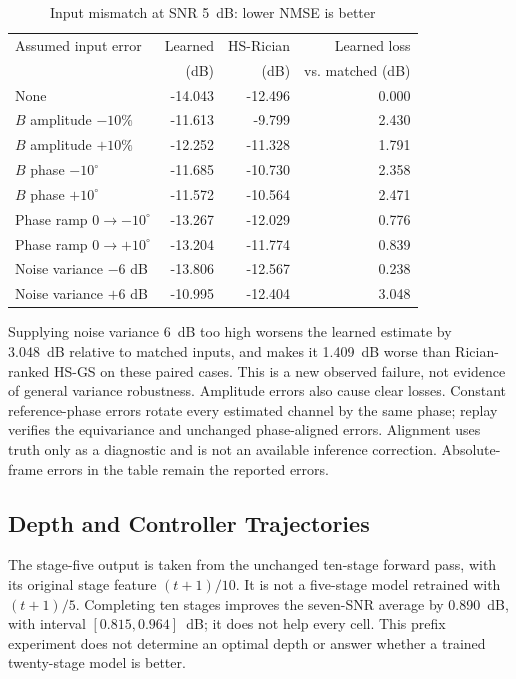 \begin{table}[!t]
\caption{Input mismatch at SNR 5~dB: lower NMSE is better}
\centering\small\setlength{\tabcolsep}{5pt}
\begin{tabular}{@{}lrrr@{}}\toprule
Assumed input error & Learned & HS-Rician & Learned loss\\
 & (dB) & (dB) & vs. matched (dB)\\\midrule

None & -14.043 & -12.496 & 0.000\\

$B$ amplitude $-10\%$ & -11.613 & -9.799 & 2.430\\

$B$ amplitude $+10\%$ & -12.252 & -11.328 & 1.791\\

$B$ phase $-10^\circ$ & -11.685 & -10.730 & 2.358\\

$B$ phase $+10^\circ$ & -11.572 & -10.564 & 2.471\\

Phase ramp $0\to-10^\circ$ & -13.267 & -12.029 & 0.776\\

Phase ramp $0\to+10^\circ$ & -13.204 & -11.774 & 0.839\\

Noise variance $-6$ dB & -13.806 & -12.567 & 0.238\\

Noise variance $+6$ dB & -10.995 & -12.404 & 3.048\\

\bottomrule\end{tabular}
\end{table}

Supplying noise variance 6~dB too high worsens the learned estimate by
3.048~dB relative to matched inputs, and makes it 1.409~dB worse than
Rician-ranked HS-GS on these paired cases. This is a new observed failure,
not evidence of general variance robustness. Amplitude errors also cause
clear losses. Constant reference-phase errors rotate every estimated
channel by the same phase; replay verifies the equivariance and unchanged
phase-aligned errors. Alignment uses truth only as a diagnostic and is
not an available inference correction. Absolute-frame errors in the table
remain the reported errors.

\subsection{Depth and Controller Trajectories}
The stage-five output is taken from the unchanged ten-stage forward pass,
with its original stage feature $(t+1)/10$. It is not a five-stage model
retrained with $(t+1)/5$. Completing ten stages improves the seven-SNR
average by 0.890~dB, with interval $[0.815,0.964]$~dB; it does not help
every cell. This prefix experiment does not determine an optimal depth
or answer whether a trained twenty-stage model is better.

